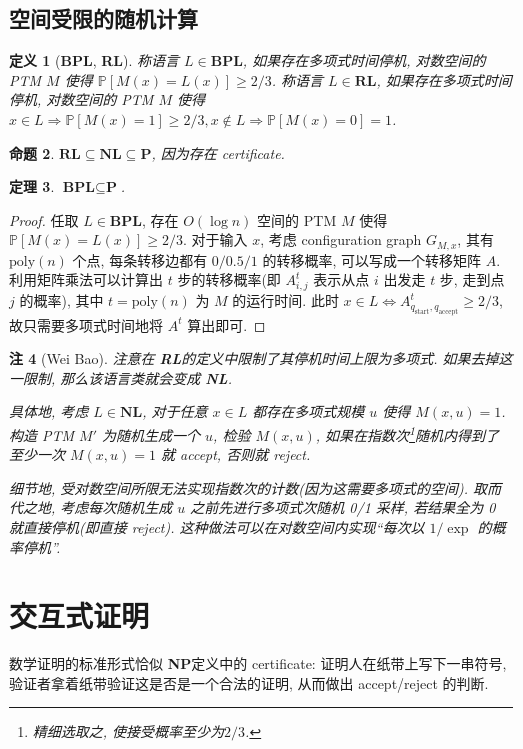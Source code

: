 \documentclass[8pt]{article}
\theoremstyle{compact}
\newtheorem{theorem}{定理}[section]
\newtheorem{definition}[theorem]{定义}
\newtheorem{proposition}[theorem]{命题}
\newtheorem{remark}[theorem]{注}
\def\ge{\geqslant}
\def\P{\textbf{P}}
\def\NP{\textbf{NP}}
\def\NL{\textbf{NL}}
\begin{document}
\subsection{空间受限的随机计算}
\def\BPL{\textbf{BPL}}
\def\RL{\textbf{RL}}

\begin{definition}[\BPL, \RL]
	称语言 $L \in \BPL$, 如果存在多项式时间停机, 对数空间的 PTM $M$ 使得 $\mathbb P[M(x) = L(x)] \ge 2/3$. 称语言 $L \in \RL$, 如果存在多项式时间停机, 对数空间的 PTM $M$ 使得 $x \in L \Rightarrow \mathbb P[M(x)=1] \ge 2/3, x \notin L \Rightarrow \mathbb P[M(x) = 0] = 1$.
\end{definition}
\begin{proposition}
	$\RL \subseteq \NL \subseteq \P$, 因为存在 certificate.
\end{proposition}
\begin{theorem}
	$\BPL \subseteq \P$.
\end{theorem}
\begin{proof}
	任取 $L \in \BPL$, 存在 $O(\log n)$ 空间的 PTM $M$ 使得 $\mathbb P[M(x) = L(x)] \ge 2/3$. 对于输入 $x$, 考虑 configuration graph $G_{M, x}$, 其有 $\text{poly}(n)$ 个点, 每条转移边都有 $0/0.5/1$ 的转移概率, 可以写成一个转移矩阵 $A$. 利用矩阵乘法可以计算出 $t$ 步的转移概率(即 $A^t_{i, j}$ 表示从点 $i$ 出发走 $t$ 步, 走到点 $j$ 的概率), 其中 $t = \text{poly}(n)$ 为 $M$ 的运行时间. 此时 $x \in L \Leftrightarrow A^t_{q_{\text{start}}, q_{\text{accept}}} \ge 2/3$, 故只需要多项式时间地将 $A^t$ 算出即可.
\end{proof}
\begin{remark}[Wei Bao]
	注意在 \RL 的定义中限制了其停机时间上限为多项式. 如果去掉这一限制, 那么该语言类就会变成 \NL.

	具体地, 考虑 $L \in \NL$, 对于任意 $x \in L$ 都存在多项式规模 $u$ 使得 $M(x, u) = 1$. 构造 PTM $M'$ 为随机生成一个 $u$, 检验 $M(x, u)$, 如果在指数次\footnote{精细选取之, 使接受概率至少为$2/3$.}随机内得到了至少一次 $M(x, u) = 1$ 就 accept, 否则就 reject. 

	细节地, 受对数空间所限无法实现指数次的计数(因为这需要多项式的空间). 取而代之地, 考虑每次随机生成 $u$ 之前先进行多项式次随机 0/1 采样, 若结果全为 0 就直接停机(即直接 reject). 这种做法可以在对数空间内实现“每次以 $1 / \exp$ 的概率停机”.


\end{remark}

\newpage
\section{交互式证明}
数学证明的标准形式恰似 \NP 定义中的 certificate: 证明人在纸带上写下一串符号, 验证者拿着纸带验证这是否是一个合法的证明, 从而做出 accept/reject 的判断.
\end{document}
